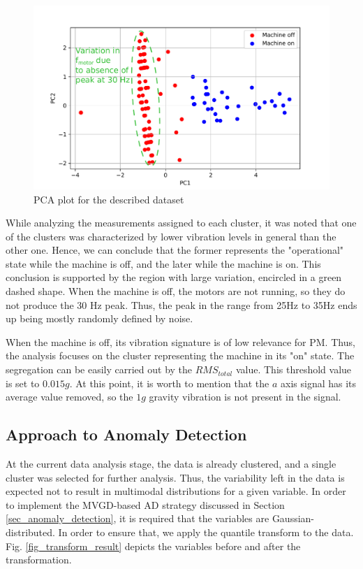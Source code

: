 \documentclass[conference]{IEEEtran}
\begin{document}
\begin{figure}[htbp]
\centerline{\includegraphics[width=0.9\columnwidth]{graphics/pca_result/pca_result.pdf}}
\caption{PCA plot for the described dataset}
\label{fig_pca_result}
\end{figure}

While analyzing the measurements assigned to each cluster, it was noted that one of the clusters was characterized by lower vibration levels in general than the other one. Hence, we can conclude that the former represents the "operational" state while the machine is off, and the later while the machine is on. This conclusion is supported by the region with large variation, encircled in a green dashed shape. When the machine is off, the motors are not running, so they do not produce the 30 Hz peak. Thus, the peak in the range from 25Hz to 35Hz ends up being mostly randomly defined by noise.

When the machine is off, its vibration signature is of low relevance for PM. Thus, the analysis focuses on the cluster representing the machine in its "on" state. The segregation can be easily carried out by the $RMS_{total}$ value. This threshold value is set to $0.015g$. At this point, it is worth to mention that the $a$ axis signal has its average value removed, so the $1g$ gravity vibration is not present in the signal.

\subsection{Approach to Anomaly Detection}
At the current data analysis stage, the data is already clustered, and a single cluster was selected for further analysis. Thus, the variability left in the data is expected not to result in multimodal distributions for a given variable. In order to implement the MVGD-based AD strategy discussed in Section \ref{sec_anomaly_detection}, it is required that the variables are Gaussian-distributed. In order to ensure that, we apply the quantile transform to the data. Fig. \ref{fig_transform_result} depicts the variables before and after the transformation.
\end{document}
